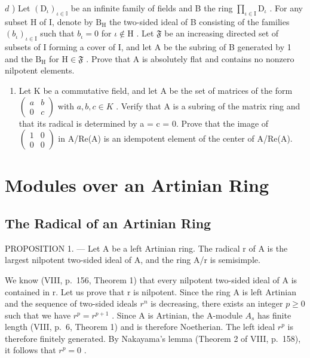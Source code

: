 \(d\) ) Let \((\mathrm{D}_{\iota})_{\iota \in \mathbb{I}}\) be an infinite family of fields and B the ring \(\prod_{\iota \in \mathrm{I}}\mathrm{D}_{\iota}\) . For any subset H of I, denote by \(\mathrm{B_H}\) the two-sided ideal of B consisting of the families \((b_{\iota})_{\iota \in \mathrm{I}}\) such that \(b_{\iota} = 0\) for \(\iota \notin \mathrm{H}\) . Let \(\mathfrak{F}\) be an increasing directed set of subsets of I forming a cover of I, and let A be the subring of B generated by 1 and the \(\mathrm{B_H}\) for \(\mathrm{H}\in \mathfrak{F}\) . Prove that A is absolutely flat and contains no nonzero nilpotent elements.

\begin{enumerate}
\def\labelenumi{\arabic{enumi})}
\setcounter{enumi}{30}
\tightlist
\item
  Let K be a commutative field, and let A be the set of matrices of the form \(\begin{pmatrix} a & b \\ 0 & c \end{pmatrix}\) with \(a, b, c \in K\) . Verify that A is a subring of the matrix ring and that its radical is determined by a = c = 0. Prove that the image of \(\begin{pmatrix} 1 & 0 \\ 0 & 0 \end{pmatrix}\) in A/Re(A) is an idempotent element of the center of A/Re(A).
\end{enumerate}

\section{Modules over an Artinian Ring}

\subsection{The Radical of an Artinian Ring}

PROPOSITION 1. --- Let A be a left Artinian ring. The radical r of A is the largest nilpotent two-sided ideal of A, and the ring A/r is semisimple.

We know (VIII, p.~156, Theorem 1) that every nilpotent two-sided ideal of A is contained in r. Let us prove that r is nilpotent. Since the ring A is left Artinian and the sequence of two-sided ideals \(r^{n}\) is decreasing, there exists an integer \(p \geqslant 0\) such that we have \(r^{p} = r^{p+1}\) . Since A is Artinian, the A-module \(A_{s}\) has finite length (VIII, p.~6, Theorem 1) and is therefore Noetherian. The left ideal \(r^{p}\) is therefore finitely generated. By Nakayama's lemma (Theorem 2 of VIII, p.~158), it follows that \(r^{p} = 0\) .

